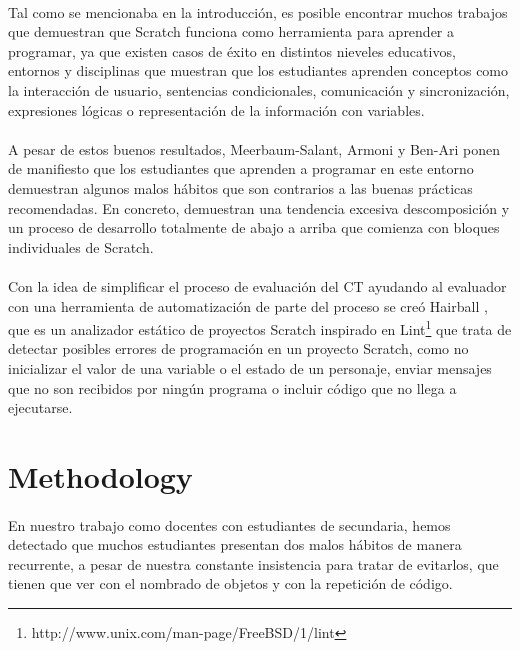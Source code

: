 \documentclass[a4paper,10pt]{article}
\begin{document}
\paragraph{}Tal como se mencionaba en la introducción, es posible encontrar muchos trabajos \cite{maloney2008programming, franklin2013assessment,scaffidi2012skill,malan2007scratch} que demuestran que Scratch funciona como herramienta para aprender a programar, ya que existen casos de éxito en distintos nieveles educativos, entornos y disciplinas que muestran que los estudiantes aprenden conceptos como la interacción de usuario, sentencias condicionales, comunicación y sincronización, expresiones lógicas o representación de la información con variables.
\paragraph{}A pesar de estos buenos resultados, Meerbaum-Salant, Armoni y Ben-Ari \cite{meerbaum2011habits} ponen de manifiesto que los estudiantes que aprenden a programar en este entorno demuestran algunos malos hábitos que son contrarios a las buenas prácticas recomendadas. En concreto, demuestran una tendencia excesiva descomposición y un proceso de desarrollo totalmente de abajo a arriba que comienza con bloques individuales de Scratch.
\paragraph{}Con la idea de simplificar el proceso de evaluación del CT ayudando al evaluador con una herramienta de automatización de parte del proceso se creó Hairball \cite{boe2013hairball}, que es un analizador estático de proyectos Scratch inspirado en Lint\footnote{http://www.unix.com/man-page/FreeBSD/1/lint} que trata de detectar posibles errores de programación en un proyecto Scratch, como no inicializar el valor de una variable o el estado de un personaje, enviar mensajes que no son recibidos por ningún programa o incluir código que no llega a ejecutarse.

\section{Methodology}

\paragraph{}En nuestro trabajo como docentes con estudiantes de secundaria, hemos detectado que muchos estudiantes presentan dos malos hábitos de manera recurrente, a pesar de nuestra constante insistencia para tratar de evitarlos, que tienen que ver con el nombrado de objetos y con la repetición de código.
\end{document}
